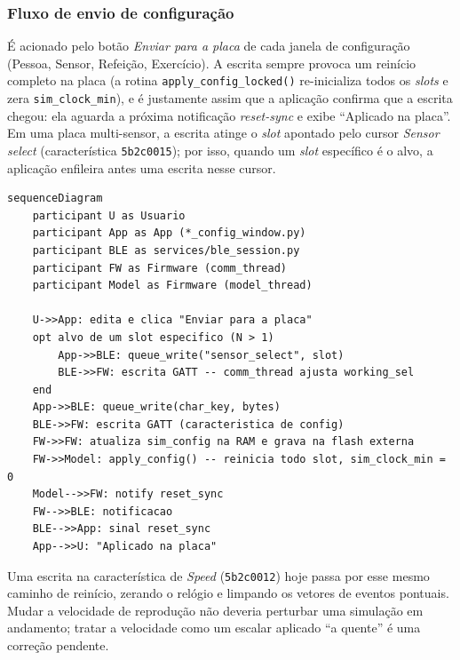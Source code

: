 \subsubsection{Fluxo de envio de configuração}
\label{sec:fluxo-envio}

É acionado pelo botão \emph{Enviar para a placa} de cada janela de
configuração (Pessoa, Sensor, Refeição, Exercício). A escrita sempre provoca
um reinício completo na placa (a rotina \texttt{apply\_config\_locked()}
re-inicializa todos os \textit{slots} e zera \texttt{sim\_clock\_min}), e é
justamente assim que a aplicação confirma que a escrita chegou: ela aguarda a
próxima notificação \textit{reset-sync} e exibe ``Aplicado na placa''. Em uma
placa multi-sensor, a escrita atinge o \textit{slot} apontado pelo cursor
\textit{Sensor select} (característica \texttt{5b2c0015}); por isso, quando um
\textit{slot} específico é o alvo, a aplicação enfileira antes uma escrita
nesse cursor.

\begin{lstlisting}[language=mermaid,caption={Fluxo de envio de configuração, com o reinício e a confirmação por reset-sync.},label={lst:fluxo-envio}]
sequenceDiagram
    participant U as Usuario
    participant App as App (*_config_window.py)
    participant BLE as services/ble_session.py
    participant FW as Firmware (comm_thread)
    participant Model as Firmware (model_thread)

    U->>App: edita e clica "Enviar para a placa"
    opt alvo de um slot especifico (N > 1)
        App->>BLE: queue_write("sensor_select", slot)
        BLE->>FW: escrita GATT -- comm_thread ajusta working_sel
    end
    App->>BLE: queue_write(char_key, bytes)
    BLE->>FW: escrita GATT (caracteristica de config)
    FW->>FW: atualiza sim_config na RAM e grava na flash externa
    FW->>Model: apply_config() -- reinicia todo slot, sim_clock_min = 0
    Model-->>FW: notify reset_sync
    FW-->>BLE: notificacao
    BLE-->>App: sinal reset_sync
    App-->>U: "Aplicado na placa"
\end{lstlisting}

Uma escrita na característica de \emph{Speed} (\texttt{5b2c0012}) hoje passa
por esse mesmo caminho de reinício, zerando o relógio e limpando os vetores
de eventos pontuais. Mudar a velocidade de reprodução não deveria perturbar
uma simulação em andamento; tratar a velocidade como um escalar aplicado ``a
quente'' é uma correção pendente.

